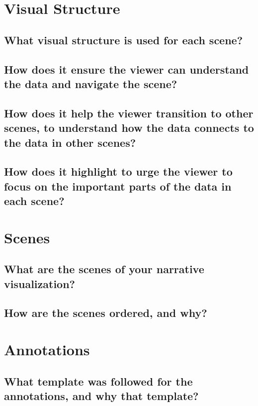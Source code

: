\documentclass[letterpaper, 11pt]{article}
\begin{document}
\section{Visual Structure}
\label{sec:VisualStructure}
\subsection{What visual structure is used for each scene?}
\label{subsec:VisualStructure1}
\subsection{How does it ensure the viewer can understand the data and navigate the scene?}
\label{subsec:VisualStructure2}

\subsection{How does it help the viewer transition to other scenes, to understand how the data connects to the data in other scenes?}
\label{subsec:VisualStructure3}

\subsection{How does it highlight to urge the viewer to focus on the important parts of the data in each scene?}
\label{subsec:VisualStructure4}


\section{Scenes}
\label{sec:Scenes}
\subsection{What are the scenes of your narrative visualization?}
\label{subsec:Scenes1}
\subsection{How are the scenes ordered, and why?}
\label{subsec:Scenes2}


\section{Annotations}
\label{sec:Annotations}
\subsection{What template was followed for the annotations, and why that template?}
\label{subsec:Annotations1}
\end{document}
